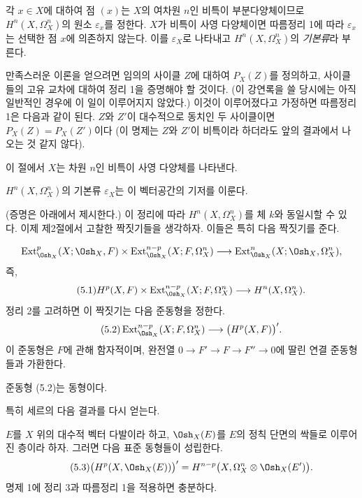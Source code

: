 각 $x\in X$에 대하여 점 $(x)$는 $X$의 여차원 $n$인 비특이
부분다양체이므로 $H^{n}(X,\Omega_X^{n})$의 원소 $\varepsilon_x$를 정한다.
$X$가 비특이 사영 다양체이면 따름정리 1에 따라 $\varepsilon_x$는 선택한
점 $x$에 의존하지 않는다. 이를 $\varepsilon_X$로 나타내고
$H^{n}(X,\Omega_X^{n})$의 \emph{기본류}라 부른다.

 만족스러운 이론을 얻으려면 임의의 사이클 $Z$에 대하여
$P_X(Z)$를 정의하고, 사이클들의 고유 교차에 대하여 정리 1을 증명해야 할
것이다. (이 강연록을 쓸 당시에는 아직 일반적인 경우에 이 일이 이루어지지
않았다.) 이것이 이루어졌다고 가정하면 따름정리 1은 다음과 같이 된다.
$Z$와 $Z'$이 대수적으로 동치인 두 사이클이면 $P_X(Z)=P_X(Z')$이다
(이 명제는 $Z$와 $Z'$이 비특이라 하더라도 앞의 결과에서 나오는 것 같지
않다).


이 절에서 $X$는 차원 $n$인 비특이 사영 다양체를 나타낸다.

 $H^{n}(X,\Omega_X^{n})$의 기본류 $\varepsilon_X$는 이
벡터공간의 기저를 이룬다.

(증명은 아래에서 제시한다.) 이 정리에 따라
$H^{n}(X,\Omega_X^{n})$를 체 $k$와 동일시할 수 있다. 이제 제2절에서
고찰한 짝짓기들을 생각하자. 이들은 특히 다음 짝짓기를 준다.

\[
\operatorname{Ext}_{\Osh_X}^{p}(X;\Osh_X,F)
\times\operatorname{Ext}_{\Osh_X}^{n-p}(X;F,\Omega_X^{n})
\longrightarrow
\operatorname{Ext}_{\Osh_X}^{n}(X;\Osh_X,\Omega_X^{n}),
\]
즉,
\begin{equation}\tag{5.1}
  H^{p}(X,F)
  \times\operatorname{Ext}_{\Osh_X}^{n-p}(X;F,\Omega_X^{n})
  \longrightarrow H^{n}(X,\Omega_X^{n}).
\end{equation}
정리 2를 고려하면 이 짝짓기는 다음 준동형을 정한다.
\begin{equation}\tag{5.2}
  \operatorname{Ext}_{\Osh_X}^{n-p}(X;F,\Omega_X^{n})
  \longrightarrow\bigl(H^{p}(X,F)\bigr)'.
\end{equation}
이 준동형은 $F$에 관해 함자적이며, 완전열
$0\longrightarrow F'\longrightarrow F\longrightarrow F''
\longrightarrow0$에 딸린 연결 준동형들과 가환한다.

 준동형 (5.2)는 동형이다.

특히 세르의 다음 결과를 다시 얻는다.

 $E$를 $X$ 위의 대수적 벡터 다발이라 하고,
$\Osh_X(E)$를 $E$의 정칙 단면의 싹들로 이루어진 층이라 하자. 그러면
다음 표준 동형들이 성립한다.
\begin{equation}\tag{5.3}
  \bigl(H^{p}(X,\Osh_X(E))\bigr)'
  =H^{n-p}\bigl(X,\Omega_X^{n}\otimes\Osh_X(E')\bigr).
\end{equation}
명제 1에 정리 3과 따름정리 1을 적용하면 충분하다.

